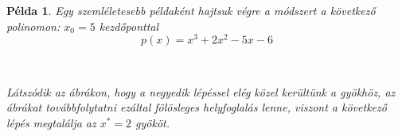 \documentclass[a4paper,12pt]{report}
\newtheorem{Pl}[Tet]{Példa}
\begin{document}
            \begin{Pl}
            	Egy szemléletesebb példaként hajtsuk végre a módszert a következő polinomon: $x_0=5$ kezdőponttal \[p(x)=x^3+2x^2-5x-6\]
            \begin{figure}[htp!]
           		\centering
                \hspace{3mm} %
               	\\
                \hspace{3mm} %
           	 \end{figure}
             
             Látszódik az ábrákon, hogy a negyedik lépéssel elég közel kerültünk a gyökhöz, az ábrákat továbbfolytatni ezáltal fölösleges helyfoglalás lenne, viszont a következő lépés megtalálja az $x^*=2$ gyököt.
            \end{Pl}
\end{document}
